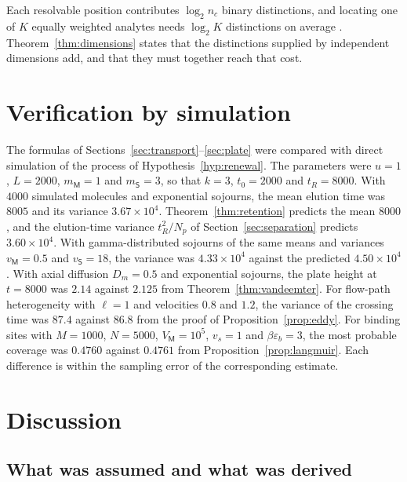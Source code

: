 \documentclass[11pt,a4paper]{article}
\theoremstyle{definition}
\theoremstyle{remark}
\newcommand{\Mob}{\mathsf{M}}
\newcommand{\Sta}{\mathsf{S}}
\begin{document}
Each resolvable position contributes $\log_2n_c$ binary distinctions, and locating one of $K$ equally weighted analytes needs $\log_2K$ distinctions on average \citep{cover2006}.
Theorem~\ref{thm:dimensions} states that the distinctions supplied by independent dimensions add, and that they must together reach that cost.

\section{Verification by simulation}
\label{sec:simulation}

The formulas of Sections~\ref{sec:transport}--\ref{sec:plate} were compared with direct simulation of the process of Hypothesis~\ref{hyp:renewal}.
The parameters were $u=1$, $L=2000$, $m_\Mob=1$ and $m_\Sta=3$, so that $k=3$, $t_0=2000$ and $t_R=8000$.
With $4000$ simulated molecules and exponential sojourns, the mean elution time was $8005$ and its variance $3.67\times10^{4}$.
Theorem~\ref{thm:retention} predicts the mean $8000$, and the elution-time variance $t_R^{2}/N_p$ of Section~\ref{sec:separation} predicts $3.60\times10^{4}$.
With gamma-distributed sojourns of the same means and variances $v_\Mob=0.5$ and $v_\Sta=18$, the variance was $4.33\times10^{4}$ against the predicted $4.50\times10^{4}$.
With axial diffusion $D_m=0.5$ and exponential sojourns, the plate height at $t=8000$ was $2.14$ against $2.125$ from Theorem~\ref{thm:vandeemter}.
For flow-path heterogeneity with $\ell=1$ and velocities $0.8$ and $1.2$, the variance of the crossing time was $87.4$ against $86.8$ from the proof of Proposition~\ref{prop:eddy}.
For binding sites with $M=1000$, $N=5000$, $V_\Mob=10^{5}$, $v_s=1$ and $\beta\varepsilon_b=3$, the most probable coverage was $0.4760$ against $0.4761$ from Proposition~\ref{prop:langmuir}.
Each difference is within the sampling error of the corresponding estimate.

\section{Discussion}
\label{sec:discussion}

\subsection{What was assumed and what was derived}
\end{document}
